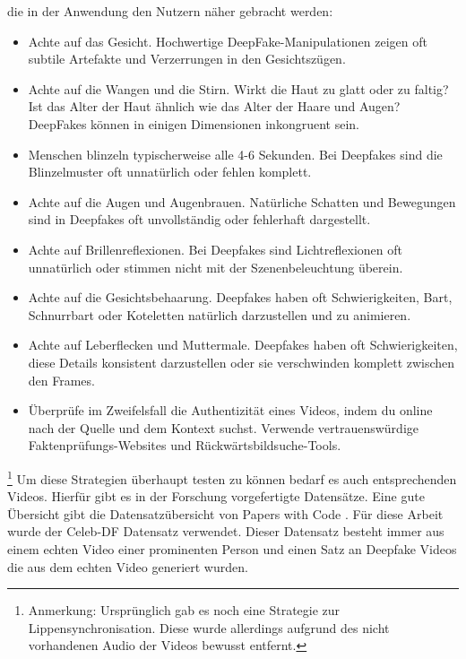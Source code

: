 die in der Anwendung den Nutzern näher gebracht werden:
\begin{itemize}
    \item Achte auf das Gesicht. Hochwertige DeepFake-Manipulationen zeigen oft subtile Artefakte und Verzerrungen in den Gesichtszügen.
    \item Achte auf die Wangen und die Stirn. Wirkt die Haut zu glatt oder zu faltig? 
        Ist das Alter der Haut ähnlich wie das Alter der Haare und Augen? DeepFakes können in einigen Dimensionen inkongruent sein.
    \item Menschen blinzeln typischerweise alle 4-6 Sekunden. Bei Deepfakes sind die Blinzelmuster oft unnatürlich oder fehlen komplett.
    \item Achte auf die Augen und Augenbrauen. Natürliche Schatten und Bewegungen sind in Deepfakes oft unvollständig oder fehlerhaft dargestellt.
    \item Achte auf Brillenreflexionen. Bei Deepfakes sind Lichtreflexionen oft unnatürlich oder stimmen nicht mit der Szenenbeleuchtung überein.
    \item Achte auf die Gesichtsbehaarung. Deepfakes haben oft Schwierigkeiten, Bart, Schnurrbart oder Koteletten natürlich darzustellen und zu animieren.
    \item Achte auf Leberflecken und Muttermale. Deepfakes haben oft Schwierigkeiten, diese Details konsistent darzustellen oder sie verschwinden komplett zwischen den Frames.
    \item Überprüfe im Zweifelsfall die Authentizität eines Videos, 
        indem du online nach der Quelle und dem Kontext suchst. Verwende vertrauenswürdige Faktenprüfungs-Websites und Rückwärtsbildsuche-Tools.
\end{itemize}
\footnote{Anmerkung: Ursprünglich gab es noch eine Strategie zur Lippensynchronisation. 
Diese wurde allerdings aufgrund des nicht vorhandenen Audio der Videos bewusst entfernt.}
Um diese Strategien überhaupt testen zu können bedarf es auch entsprechenden Videos. 
Hierfür gibt es in der Forschung vorgefertigte Datensätze. 
Eine gute Übersicht gibt die Datensatzübersicht von Papers with Code \cite{PapersCodeMachine}. 
Für diese Arbeit wurde der Celeb-DF Datensatz verwendet. 
Dieser Datensatz besteht immer aus einem echten Video einer prominenten Person und einen Satz an Deepfake Videos die aus dem echten Video generiert wurden.

